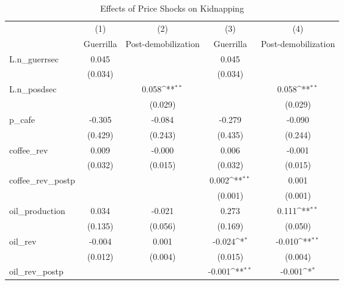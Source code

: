 \begin{table}[htbp]\centering
\def\sym#1{\ifmmode^{#1}\else\(^{#1}\)\fi}
\caption{Effects of Price Shocks on Kidnapping}
\begin{tabular}{l*{4}{c}}
\hline\hline
                &\multicolumn{1}{c}{(1)}&\multicolumn{1}{c}{(2)}&\multicolumn{1}{c}{(3)}&\multicolumn{1}{c}{(4)}\\
                &\multicolumn{1}{c}{Guerrilla}&\multicolumn{1}{c}{Post-demobilization}&\multicolumn{1}{c}{Guerrilla}&\multicolumn{1}{c}{Post-demobilization}\\
\hline
L.n\_guerrsec    &    0.045         &                  &    0.045         &                  \\
                &  (0.034)         &                  &  (0.034)         &                  \\
[1em]
L.n\_posdsec     &                  &    0.058\sym{**} &                  &    0.058\sym{**} \\
                &                  &  (0.029)         &                  &  (0.029)         \\
[1em]
p\_cafe          &   -0.305         &   -0.084         &   -0.279         &   -0.090         \\
                &  (0.429)         &  (0.243)         &  (0.435)         &  (0.244)         \\
[1em]
coffee\_rev      &    0.009         &   -0.000         &    0.006         &   -0.001         \\
                &  (0.032)         &  (0.015)         &  (0.032)         &  (0.015)         \\
[1em]
coffee\_rev\_postp&                  &                  &    0.002\sym{**} &    0.001         \\
                &                  &                  &  (0.001)         &  (0.001)         \\
[1em]
oil\_production  &    0.034         &   -0.021         &    0.273         &    0.111\sym{**} \\
                &  (0.135)         &  (0.056)         &  (0.169)         &  (0.050)         \\
[1em]
oil\_rev         &   -0.004         &    0.001         &   -0.024\sym{*}  &   -0.010\sym{**} \\
                &  (0.012)         &  (0.004)         &  (0.015)         &  (0.004)         \\
[1em]
oil\_rev\_postp   &                  &                  &   -0.001\sym{**} &   -0.001\sym{*}  \\

\end{tabular}
\end{table}
